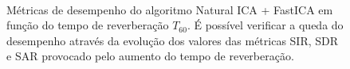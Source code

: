        
\begin{figure}
    \centering
    \\
    \caption{Métricas de desempenho do algoritmo Natural ICA + FastICA em função do tempo de reverberação $T_{60}$. É possível verificar a queda do desempenho através da evolução dos valores das métricas SIR, SDR e SAR provocado pelo aumento do tempo de reverberação.}
    \label{fig:naticareverb}
\end{figure}

